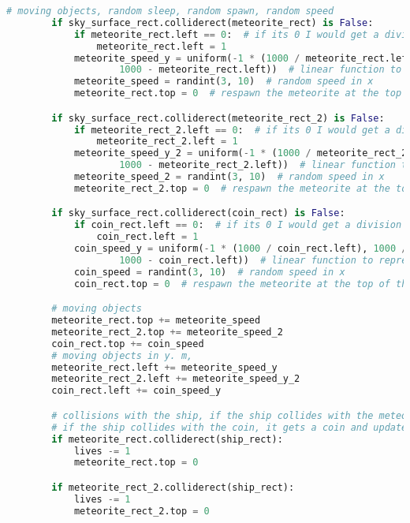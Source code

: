 \documentclass[12pt]{report}			%
\begin{document}
\begin{appendices}
\begin{lstlisting}[title={Program hra.py}, caption={hra.py},  label={lst:hra}, language=Python]
        # moving objects, random sleep, random spawn, random speed
        if sky_surface_rect.colliderect(meteorite_rect) is False:
            if meteorite_rect.left == 0:  # if its 0 I would get a division by 0 error
                meteorite_rect.left = 1
            meteorite_speed_y = uniform(-1 * (1000 / meteorite_rect.left), 1000 / (
                    1000 - meteorite_rect.left))  # linear function to represent the direction of the meteorite
            meteorite_speed = randint(3, 10)  # random speed in x
            meteorite_rect.top = 0  # respawn the meteorite at the top of the screen

        if sky_surface_rect.colliderect(meteorite_rect_2) is False:
            if meteorite_rect_2.left == 0:  # if its 0 I would get a division by 0 error
                meteorite_rect_2.left = 1
            meteorite_speed_y_2 = uniform(-1 * (1000 / meteorite_rect_2.left), 1000 / (
                    1000 - meteorite_rect_2.left))  # linear function to represent the direction of the meteorite
            meteorite_speed_2 = randint(3, 10)  # random speed in x
            meteorite_rect_2.top = 0  # respawn the meteorite at the top of the screen

        if sky_surface_rect.colliderect(coin_rect) is False:
            if coin_rect.left == 0:  # if its 0 I would get a division by 0 error
                coin_rect.left = 1
            coin_speed_y = uniform(-1 * (1000 / coin_rect.left), 1000 / (
                    1000 - coin_rect.left))  # linear function to represent the direction of the meteorite
            coin_speed = randint(3, 10)  # random speed in x
            coin_rect.top = 0  # respawn the meteorite at the top of the screen

        # moving objects
        meteorite_rect.top += meteorite_speed
        meteorite_rect_2.top += meteorite_speed_2
        coin_rect.top += coin_speed
        # moving objects in y. m,
        meteorite_rect.left += meteorite_speed_y
        meteorite_rect_2.left += meteorite_speed_y_2
        coin_rect.left += coin_speed_y

        # collisions with the ship, if the ship collides with the meteorite, it loses a life
        # if the ship collides with the coin, it gets a coin and updates the score
        if meteorite_rect.colliderect(ship_rect):
            lives -= 1
            meteorite_rect.top = 0

        if meteorite_rect_2.colliderect(ship_rect):
            lives -= 1
            meteorite_rect_2.top = 0


\end{lstlisting}
\end{appendices}
\end{document}
